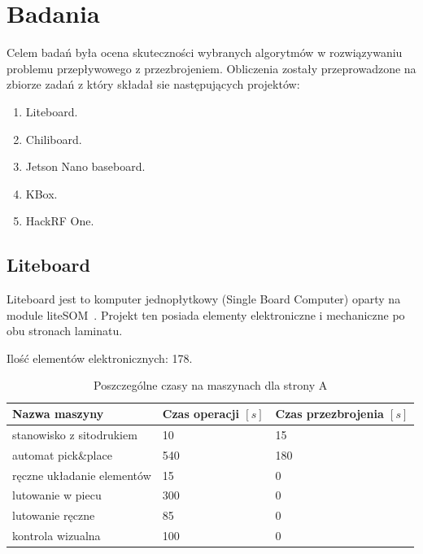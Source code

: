 \chapter{Badania}

Celem badań była ocena skuteczności wybranych algorytmów w rozwiązywaniu problemu przepływowego z przezbrojeniem. Obliczenia zostały przeprowadzone na zbiorze zadań z który składał sie następujących projektów:
\begin{enumerate}
	\item Liteboard.
	\item Chiliboard.
	\item Jetson Nano baseboard.
	\item KBox.
	\item HackRF One.
\end{enumerate}

\newpage
\section{Liteboard}

Liteboard jest to komputer jednopłytkowy (Single Board Computer) oparty na module liteSOM~\cite{liteboard}. Projekt ten posiada elementy elektroniczne i mechaniczne po obu stronach laminatu.

\breakparagraph{}
Ilość elementów elektronicznych: 178.

\begin{table}[H]
	\centering
	\caption{Poszczególne czasy na maszynach dla strony A}
	\begin{tabular}{lll}
		\toprule
		Nazwa maszyny                 & Czas operacji $[s]$ & Czas przezbrojenia $[s]$ \\
		\midrule
		stanowisko z sitodrukiem      & 10                  & 15                       \\
		automat pick\&place           & 540                 & 180                      \\
		ręczne układanie elementów & 15                  & 0                        \\
		lutowanie w piecu             & 300                 & 0                        \\
		lutowanie ręczne             & 85                  & 0                        \\
		kontrola wizualna             & 100                 & 0                        \\
		\bottomrule
	\end{tabular}
\end{table}

